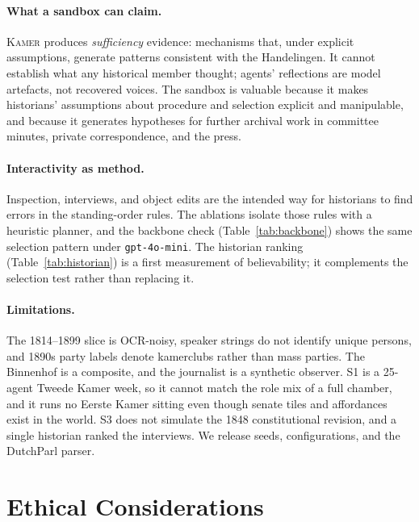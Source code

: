 \documentclass[sigconf,review,anonymous]{acmart}
\newcommand{\sys}{\textsc{Kamer}}
\begin{document}
\paragraph{What a sandbox can claim.} \sys{} produces \emph{sufficiency}
evidence: mechanisms that, under explicit assumptions, generate patterns
consistent with the Handelingen. It cannot establish what any historical
member thought; agents' reflections are model artefacts, not recovered
voices. The sandbox is valuable because it makes historians' assumptions
about procedure and selection explicit and manipulable, and because it
generates hypotheses for further archival work in committee minutes,
private correspondence, and the press.

\paragraph{Interactivity as method.} Inspection, interviews, and object
edits are the intended way for historians to find errors in the
standing-order rules. The ablations isolate those rules with a heuristic
planner, and the backbone check (Table~\ref{tab:backbone}) shows the same
selection pattern under \texttt{gpt-4o-mini}. The historian ranking
(Table~\ref{tab:historian}) is a first measurement of believability; it
complements the selection test rather than replacing it.

\paragraph{Limitations.} The 1814--1899 slice is OCR-noisy, speaker
strings do not identify unique persons, and 1890s party labels denote
kamerclubs rather than mass parties. The Binnenhof is a composite, and the
journalist is a synthetic observer. S1 is a 25-agent Tweede Kamer week, so
it cannot match the role mix of a full chamber, and it runs no Eerste Kamer
sitting even though senate tiles and affordances exist in the world. S3
does not simulate the 1848 constitutional revision, and a single historian
ranked the interviews. We release seeds, configurations, and the DutchParl
parser.

\section{Ethical Considerations}
\label{sec:ethics}
\end{document}
